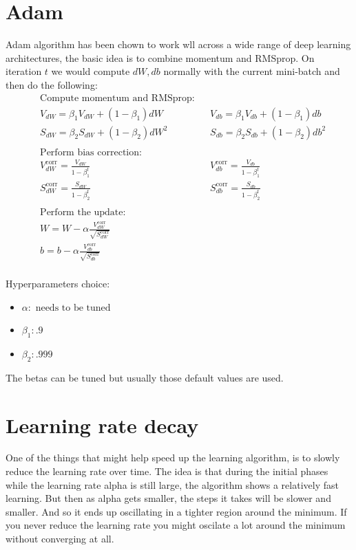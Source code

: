 \section*{Adam}
Adam algorithm has been chown to work wll across a wide range of deep learning architectures,
the basic idea is to combine momentum and RMSprop. On iteration $t$ we would compute $dW, db$ normally with the current 
mini-batch and then do the following:
\begin{align*}
    & \text{Compute momentum and RMSprop:} \\
    & V_{dW} = \beta_1 V_{dW} + (1 - \beta_1)dW  && V_{db} = \beta_1 V_{db} + (1 - \beta_1)db \\
    & S_{dW} = \beta_2 S_{dW} + (1 - \beta_2)dW^2 && S_{db} = \beta_2 S_{db} + (1 - \beta_2)db^2 \\ \\
    & \text{Perform bias correction:} \\
    & V_{dW}^{\text{corr}} = \frac{V_{dW}}{1-\beta_1^t} && V_{db}^{\text{corr}} = \frac{V_{db}}{1-\beta_1^t} \\
    & S_{dW}^{\text{corr}} = \frac{S_{dW}}{1-\beta_2^t} && S_{db}^{\text{corr}} = \frac{S_{db}}{1-\beta_2^t} \\ \\
    & \text{Perform the update:} \\
    & W = W - \alpha \frac{V_{dW}^{\text{corr}}}{\sqrt{S_{dW}^{\text{corr}}}} \\
    & b = b - \alpha \frac{V_{db}^{\text{corr}}}{\sqrt{S_{db}^{\text{corr}}}} \\
\end{align*}

Hyperparameters choice:
\begin{itemize}
    \item $\alpha : \text{ needs to be tuned}$
    \item $\beta_1 : .9$ 
    \item $\beta_2 : .999$
\end{itemize}
The betas can be tuned but usually those default values are used.

\section*{Learning rate decay}
One of the things that might help speed up the learning algorithm, is to slowly reduce 
the learning rate over time. The idea is that during the initial phases while the learning rate 
alpha is still large, the algorithm shows a relatively fast learning. But then as alpha 
gets smaller, the steps it takes will be slower and smaller. And so it ends up oscillating 
in a tighter region around the minimum. If you never reduce the learning rate you might
oscilate a lot around the minimum without converging at all.

